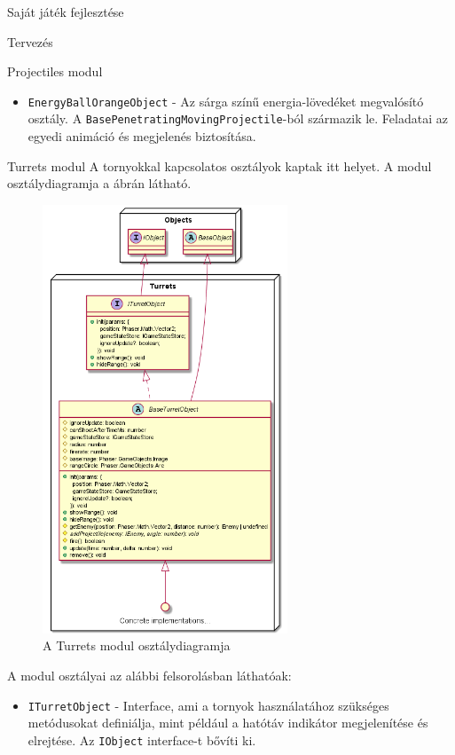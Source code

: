 \begin{MyChapter}{Saját játék fejlesztése}
\begin{MySection}{Tervezés}
\begin{MySubSection}{Projectiles modul}
\begin{itemize}
				\item \texttt{EnergyBallOrangeObject} - Az sárga színű energia-lövedéket megvalósító osztály. A \texttt{Base\-Penetrating\-Moving\-Projectile}-ból származik le. Feladatai az egyedi animáció és megjelenés biztosítása.
							
			\end{itemize}
		\end{MySubSection}

		\begin{MySubSection}{Turrets modul}
			A tornyokkal kapcsolatos osztályok kaptak itt helyet.
			A modul osztálydiagramja a  ábrán látható.
			
			\begin{figure}[h!]
				\centering
				\includegraphics[width=0.65\textwidth]{kepek/uml/turrets/turret-pt1.png}
				\caption{A Turrets modul osztálydiagramja}
				\label{fig:uml:turret}
			\end{figure}
			
			A modul osztályai az alábbi felsorolásban láthatóak:
			\begin{itemize}
				\item \texttt{ITurretObject} - Interface, ami a tornyok használatához szükséges metódusokat definiálja, mint például a hatótáv indikátor megjelenítése és elrejtése. Az \texttt{IObject} interface-t bővíti ki.
				

\end{itemize}
\end{MySubSection}
\end{MySection}
\end{MyChapter}
